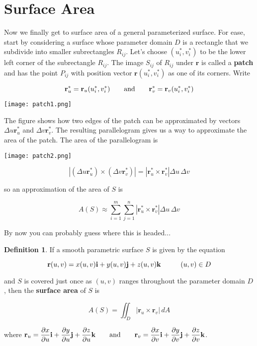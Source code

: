 \documentclass[11pt,oneside,english]{amsart}
\theoremstyle{definition}
\newtheorem*{definition}{Definition}
\newcommand{\aspace}{\hspace{7mm}\text{and}\hspace{7mm}}
\newcommand{\pspace}{\hspace{10mm}}
\newcommand{\pp}[2]{\frac{\partial{#1}}{\partial{#2}}}
\begin{document}
\pagebreak

\section*{Surface Area}

Now we finally get to surface area of a general parameterized surface. For ease, start by considering a surface whose parameter domain $D$ is a rectangle that we subdivide into smaller subrectangles $R_{ij}$. Let's choose $(u_i^*,v_i^*)$ to be the lower left corner of the subrectangle $R_{ij}$. The image $S_{ij}$ of $R_{ij}$ under $\mathbf{r}$ is called a \textbf{patch} and has the point $P_{ij}$ with position vector $\mathbf{r}(u_i^*,v_i^*)$ as one of its corners. Write

\[
\mathbf{r}_u^*=\mathbf{r}_u(u_i^*,v_i^*)\aspace \mathbf{r}_v^*=\mathbf{r}_v(u_i^*,v_i^*)
\]


\begin{center}
\texttt{[image: patch1.png]}
\end{center}

The figure shows how two edges of the patch can be approximated by vectors $\Delta u\mathbf{r}_u^*$ and $\Delta v\mathbf{r}_v^*$. The resulting parallelogram gives us a way to approximate the area of the patch. The area of the parallelogram is

\begin{center}
\texttt{[image: patch2.png]}
\end{center}

\[
|(\Delta u\mathbf{r}_u^*)\times(\Delta v\mathbf{r}_v^*)|=|\mathbf{r}_u^*\times\mathbf{r}_v^*|\Delta u\,\Delta v
\]

so an approximation of the area of $S$ is

\[
A(S)\approx\sum_{i=1}^m\sum_{j=1}^n|\mathbf{r}_u^*\times\mathbf{r}_v^*|\Delta u\,\Delta v
\]

By now you can probably guess where this is headed...

\begin{definition}
If a smooth parametric surface $S$ is given by the equation

\[
\mathbf{r}(u,v)=x(u,v)\mathbf{i}+y(u,v)\mathbf{j}+z(u,v)\mathbf{k}\pspace (u,v)\in D
\]

and $S$ is covered just once as $(u,v)$ ranges throughout the parameter domain $D$, then the \textbf{surface area} of $S$ is

\[
A(S)=\iint_D|\mathbf{r}_u\times\mathbf{r}_v|\,dA
\]

where $\displaystyle \mathbf{r}_u=\pp{x}{u}\mathbf{i}+\pp{y}{u}\mathbf{j}+\pp{z}{u}\mathbf{k}\aspace \mathbf{r}_v=\pp{x}{v}\mathbf{i}+\pp{y}{v}\mathbf{j}+\pp{z}{v}\mathbf{k}$.

\end{definition}
\end{document}
